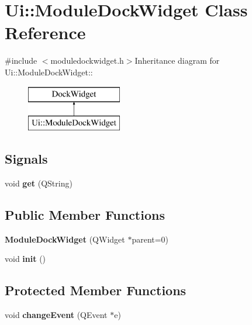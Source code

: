 \hypertarget{classUi_1_1ModuleDockWidget}{
\section{Ui::ModuleDockWidget Class Reference}
\label{classUi_1_1ModuleDockWidget}
}


{\ttfamily \#include $<$moduledockwidget.h$>$}Inheritance diagram for Ui::ModuleDockWidget::\begin{figure}[H]
\begin{center}
\leavevmode
\includegraphics[height=2cm]{classUi_1_1ModuleDockWidget}
\end{center}
\end{figure}
\subsection*{Signals}
\begin{DoxyCompactItemize}
\item 
\hypertarget{classUi_1_1ModuleDockWidget_acc7fb736ce707a57272437f666ff0323}{
void {\bfseries get} (QString)}
\label{classUi_1_1ModuleDockWidget_acc7fb736ce707a57272437f666ff0323}

\end{DoxyCompactItemize}
\subsection*{Public Member Functions}
\begin{DoxyCompactItemize}
\item 
\hypertarget{classUi_1_1ModuleDockWidget_a14a59f99ab7068006a461bfec8cd8e52}{
{\bfseries ModuleDockWidget} (QWidget $\ast$parent=0)}
\label{classUi_1_1ModuleDockWidget_a14a59f99ab7068006a461bfec8cd8e52}

\item 
\hypertarget{classUi_1_1ModuleDockWidget_a472e15cdb7461ac6f2a3d855cf781ce4}{
void {\bfseries init} ()}
\label{classUi_1_1ModuleDockWidget_a472e15cdb7461ac6f2a3d855cf781ce4}

\end{DoxyCompactItemize}
\subsection*{Protected Member Functions}
\begin{DoxyCompactItemize}
\item 
\hypertarget{classUi_1_1ModuleDockWidget_a0fbd303eb8b5cdbc257c19088d415840}{
void {\bfseries changeEvent} (QEvent $\ast$e)}
\label{classUi_1_1ModuleDockWidget_a0fbd303eb8b5cdbc257c19088d415840}

\end{DoxyCompactItemize}


